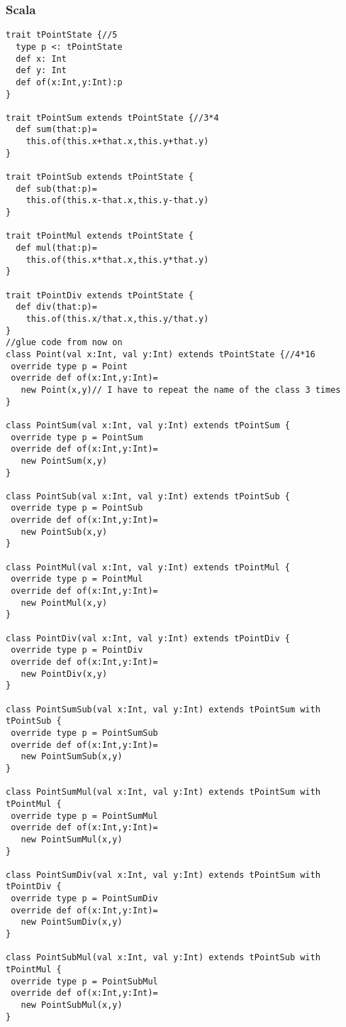 \subsubsection{Scala}
\lstset{language=Scala}
\begin{lstlisting}
trait tPointState {//5
  type p <: tPointState
  def x: Int
  def y: Int
  def of(x:Int,y:Int):p
}

trait tPointSum extends tPointState {//3*4
  def sum(that:p)=
    this.of(this.x+that.x,this.y+that.y)  
}

trait tPointSub extends tPointState {
  def sub(that:p)=
    this.of(this.x-that.x,this.y-that.y)  
}

trait tPointMul extends tPointState {
  def mul(that:p)=
    this.of(this.x*that.x,this.y*that.y)  
}

trait tPointDiv extends tPointState {
  def div(that:p)=
    this.of(this.x/that.x,this.y/that.y)  
}
//glue code from now on
class Point(val x:Int, val y:Int) extends tPointState {//4*16
 override type p = Point
 override def of(x:Int,y:Int)=
   new Point(x,y)// I have to repeat the name of the class 3 times
}

class PointSum(val x:Int, val y:Int) extends tPointSum {
 override type p = PointSum
 override def of(x:Int,y:Int)=
   new PointSum(x,y)
}

class PointSub(val x:Int, val y:Int) extends tPointSub {
 override type p = PointSub
 override def of(x:Int,y:Int)=
   new PointSub(x,y)
}

class PointMul(val x:Int, val y:Int) extends tPointMul {
 override type p = PointMul
 override def of(x:Int,y:Int)=
   new PointMul(x,y)
}

class PointDiv(val x:Int, val y:Int) extends tPointDiv {
 override type p = PointDiv
 override def of(x:Int,y:Int)=
   new PointDiv(x,y)
}

class PointSumSub(val x:Int, val y:Int) extends tPointSum with tPointSub {
 override type p = PointSumSub
 override def of(x:Int,y:Int)=
   new PointSumSub(x,y)
}

class PointSumMul(val x:Int, val y:Int) extends tPointSum with tPointMul {
 override type p = PointSumMul
 override def of(x:Int,y:Int)=
   new PointSumMul(x,y)
}

class PointSumDiv(val x:Int, val y:Int) extends tPointSum with tPointDiv {
 override type p = PointSumDiv
 override def of(x:Int,y:Int)=
   new PointSumDiv(x,y)
}

class PointSubMul(val x:Int, val y:Int) extends tPointSub with tPointMul {
 override type p = PointSubMul
 override def of(x:Int,y:Int)=
   new PointSubMul(x,y)
}


\end{lstlisting}
